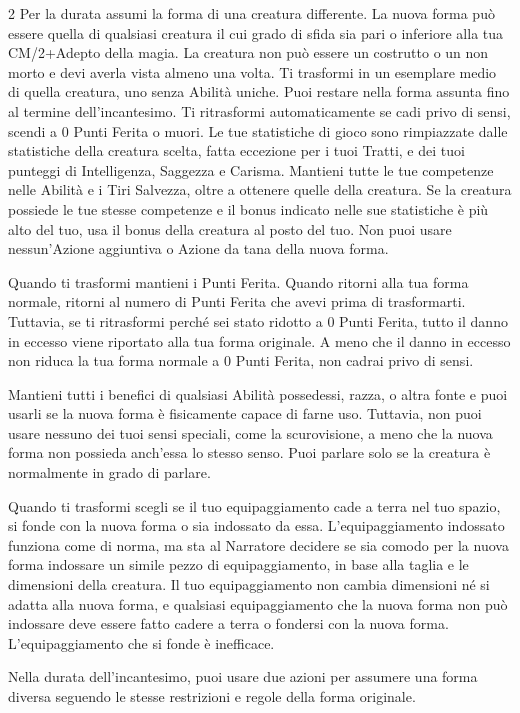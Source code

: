 \begin{multicols}{2}
Per la durata assumi la forma di una creatura differente. La nuova forma può essere quella di qualsiasi creatura il cui grado di sfida sia pari o inferiore alla tua CM/2+Adepto della magia. La creatura non può essere un costrutto o un non morto e devi averla vista almeno una volta. Ti trasformi in un esemplare medio di quella creatura, uno senza Abilità uniche. Puoi restare nella forma assunta fino al termine dell'incantesimo. Ti ritrasformi automaticamente se cadi privo di sensi, scendi a 0 Punti Ferita o muori. Le tue statistiche di gioco sono rimpiazzate dalle statistiche della creatura scelta, fatta eccezione per i tuoi Tratti, e dei tuoi punteggi di Intelligenza, Saggezza e Carisma. Mantieni tutte le tue competenze nelle Abilità e i Tiri Salvezza, oltre a ottenere quelle della creatura. Se la creatura possiede le tue stesse competenze e il bonus indicato nelle sue statistiche è più alto del tuo, usa il bonus della creatura al posto del tuo. Non puoi usare nessun'Azione aggiuntiva o Azione da tana della nuova forma.

Quando ti trasformi mantieni i Punti Ferita. Quando ritorni alla tua forma normale, ritorni al numero di Punti Ferita che avevi prima di trasformarti. Tuttavia, se ti ritrasformi perché sei stato ridotto a 0 Punti Ferita, tutto il danno in eccesso viene riportato alla tua forma originale. A meno che il danno in eccesso non riduca la tua forma normale a 0 Punti Ferita, non cadrai privo di sensi.

Mantieni tutti i benefici di qualsiasi Abilità possedessi, razza, o altra fonte e puoi usarli se la nuova forma è fisicamente capace di farne uso. Tuttavia, non puoi usare nessuno dei tuoi sensi speciali, come la scurovisione, a meno che la nuova forma non possieda anch'essa lo stesso senso. Puoi parlare solo se la creatura è normalmente in grado di parlare.

Quando ti trasformi scegli se il tuo equipaggiamento cade a terra nel tuo spazio, si fonde con la nuova forma o sia indossato da essa. L'equipaggiamento indossato funziona come di norma, ma sta al Narratore decidere se sia comodo per la nuova forma indossare un simile pezzo di equipaggiamento, in base alla taglia e le dimensioni della creatura. Il tuo equipaggiamento non cambia dimensioni né si adatta alla nuova forma, e qualsiasi equipaggiamento che la nuova forma non può indossare deve essere fatto cadere a terra o fondersi con la nuova forma. L'equipaggiamento che si fonde è inefficace.

Nella durata dell'incantesimo, puoi usare due azioni per assumere una forma diversa seguendo le stesse restrizioni e regole della forma originale.


\end{multicols}
